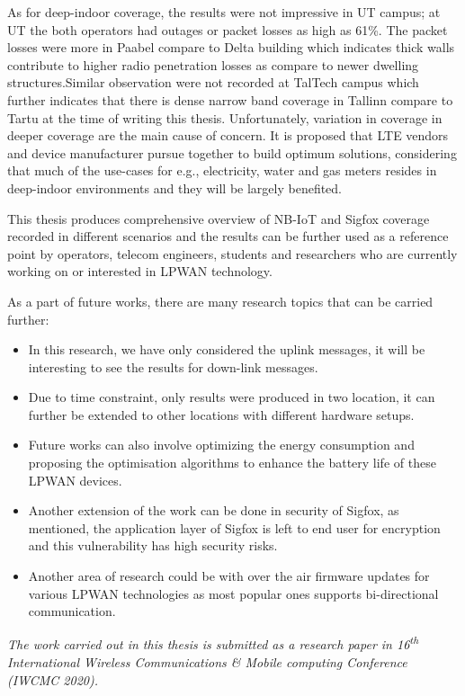 \documentclass[12pt]{article}
\begin{document}
As for deep-indoor coverage, the results were not impressive in UT campus; at UT the both operators had outages or packet losses as high as 61\%. The packet losses were more in Paabel compare to Delta  building which indicates thick walls contribute to higher radio penetration losses as compare to newer dwelling structures.Similar observation were not recorded at TalTech campus which further indicates that there is dense narrow band coverage in Tallinn compare to Tartu at the time of writing this thesis. Unfortunately, variation in coverage in deeper coverage are the main cause of concern. It is proposed that LTE vendors and device manufacturer pursue together to build optimum solutions, considering that much of the use-cases for e.g., electricity, water and gas meters resides in deep-indoor environments and they will be largely benefited. 


This thesis produces comprehensive overview of NB-IoT and Sigfox coverage recorded in different scenarios and the results  can  be  further  used as a reference point by operators, telecom engineers, students and researchers who are currently working on or interested in LPWAN technology.\par 

As a part of future works, there are many research topics that can be carried further:
\begin{itemize}
    \item In this research, we have only considered the uplink messages, it will be interesting to see the results for down-link messages.
    \item Due to time constraint, only results were produced in two location, it can further be extended to other locations with different hardware setups.
    \item Future works can also involve optimizing the energy consumption and proposing the optimisation algorithms to enhance the battery life of these LPWAN devices.
    \item Another extension of the work can be done in security of Sigfox, as mentioned, the application layer of Sigfox is left to end user for encryption and this vulnerability has high security risks. 
    \item Another area of research could be with over the air firmware updates for various LPWAN technologies as most popular ones supports bi-directional communication.

\end{itemize}


\emph{The work carried out in this thesis is submitted as a research paper in 16\textsuperscript{th} International  Wireless Communications \& Mobile computing Conference (IWCMC 2020).}
\end{document}
